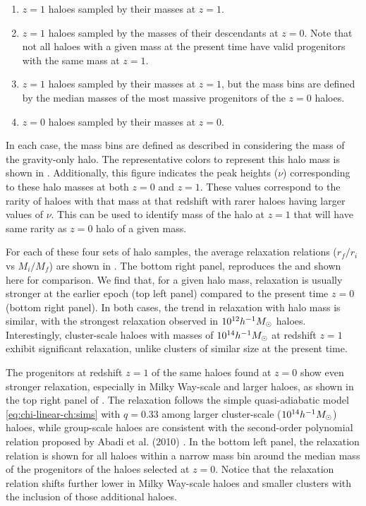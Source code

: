 \begin{enumerate}
    \item $z=1$ haloes sampled by their masses at $z=1$.
    \item $z=1$ haloes sampled by the masses of their descendants at $z=0$. Note that not all haloes with a given mass at the present time have valid progenitors with the same mass at $z=1$.
    \item $z=1$ haloes sampled by their masses at $z=1$, but the mass bins are defined by the median masses of the most massive progenitors of the $z=0$ haloes.
    \item $z=0$ haloes sampled by their masses at $z=0$.
\end{enumerate}

In each case, the mass bins are defined as described in  considering the mass of the gravity-only halo. The representative colors to represent this halo mass is shown in . Additionally, this figure indicates the peak heights ($\nu$) corresponding to these halo masses at both $z=0$ and $z=1$. These values correspond to the rarity of haloes with that mass at that redshift with rarer haloes having larger values of $\nu$. This can be used to identify mass of the halo at $z=1$ that will have same rarity as $z=0$ halo of a given mass. 

For each of these four sets of halo samples, the average relaxation relations ($r_f/r_i$ vs $M_i/M_f$) are shown in . The bottom right panel, reproduces the  and shown here for comparison. We find that, for a given halo mass, relaxation is usually stronger at the earlier epoch (top left panel) compared to the present time $z=0$ (bottom right panel). In both cases, the trend in relaxation with halo mass is similar, with the strongest relaxation observed in $10^{12} h^{-1}M_{\odot}$ haloes. Interestingly, cluster-scale haloes with masses of $10^{14} h^{-1}M_{\odot}$ at redshift $z=1$ exhibit significant relaxation, unlike clusters of similar size at the present time.

The progenitors at redshift $z=1$ of the same haloes found at $z=0$ show even stronger  relaxation, especially in Milky Way-scale and larger haloes, as shown in the top right panel of . The relaxation follows the simple quasi-adiabatic model \eqref{eq:chi-linear-ch:sims} with $q=0.33$ among larger cluster-scale ($10^{14} h^{-1}M_{\odot}$) haloes, while group-scale haloes are consistent with the second-order polynomial relation proposed by Abadi et al. (2010) \cite{2010MNRAS.407..435A}. In the bottom left panel, the relaxation relation is shown for all haloes within a narrow mass bin around the median mass of the progenitors of the haloes selected at $z=0$. Notice that the relaxation relation shifts further lower in Milky Way-scale haloes and smaller clusters with the inclusion of those additional haloes.

